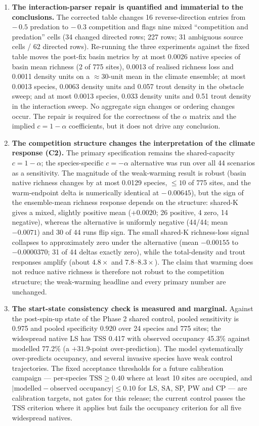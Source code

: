 \documentclass[11pt,a4paper]{article}
\begin{document}
\begin{enumerate}
    \item \textbf{The interaction-parser repair is quantified and immaterial to the conclusions.} The corrected table changes 16 reverse-direction entries from $-\,0.5$ predation to $-\,0.3$ competition and flags nine mixed ``competition and predation'' cells (34 changed directed rows; 227 rows; 31 ambiguous source cells / 62 directed rows). Re-running the three experiments against the fixed table moves the post-fix basin metrics by at most 0.0026 native species of basin mean richness (2 of 775 sites), 0.0013 of realised richness loss and 0.0011 density units on a $\approx30$-unit mean in the climate ensemble; at most 0.0013 species, 0.0063 density units and 0.057 trout density in the obstacle sweep; and at most 0.0013 species, 0.033 density units and 0.51 trout density in the interaction sweep. No aggregate sign changes or ordering changes occur. The repair is required for the correctness of the $\alpha$ matrix and the implied $c=1-\alpha$ coefficients, but it does not drive any conclusion.
    \item \textbf{The competition structure changes the interpretation of the climate response (C2).} The primary specification remains the shared-capacity $c=1-\alpha$; the species-specific $c=-\alpha$ alternative was run over all 44 scenarios as a sensitivity. The magnitude of the weak-warming result is robust (basin native richness changes by at most 0.0129 species, $\le10$ of 775 sites, and the warm-endpoint delta is numerically identical at $-\,0.00645$), but the sign of the ensemble-mean richness response depends on the structure: shared-K gives a mixed, slightly positive mean ($+0.0020$; 26 positive, 4 zero, 14 negative), whereas the alternative is uniformly negative (44/44; mean $-0.0071$) and 30 of 44 runs flip sign. The small shared-K richness-loss signal collapses to approximately zero under the alternative (mean $-0.00155$ to $-0.0000370$; 31 of 44 deltas exactly zero), while the total-density and trout responses amplify (about $4.8\times$ and $7.8$--$8.3\times$). The claim that warming does not reduce native richness is therefore not robust to the competition structure; the weak-warming headline and every primary number are unchanged.
    \item \textbf{The start-state consistency check is measured and marginal.} Against the post-spin-up state of the Phase 2 shared control, pooled sensitivity is 0.975 and pooled specificity 0.920 over 24 species and 775 sites; the widespread native LS has TSS 0.417 with observed occupancy 45.3\% against modelled 77.2\% (a $+31.9$-point over-prediction). The model systematically over-predicts occupancy, and several invasive species have weak control trajectories. The fixed acceptance thresholds for a future calibration campaign --- per-species $\mathrm{TSS}\ge0.40$ where at least 10 sites are occupied, and $|\text{modelled}-\text{observed occupancy}|\le0.10$ for LS, SA, SP, PW and CP --- are calibration targets, not gates for this release; the current control passes the TSS criterion where it applies but fails the occupancy criterion for all five widespread natives.

\end{enumerate}
\end{document}
